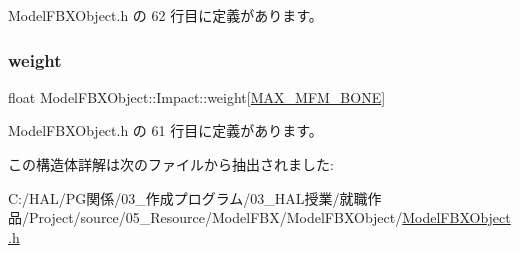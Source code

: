  Model\+F\+B\+X\+Object.\+h の 62 行目に定義があります。

\mbox{\label{struct_model_f_b_x_object_1_1_impact_a863397edc05dc95c5a39e77947f2453a}} 
\subsubsection{\texorpdfstring{weight}{weight}}
{\footnotesize\ttfamily float Model\+F\+B\+X\+Object\+::\+Impact\+::weight\mbox{[}\mbox{\hyperlink{_model_f_b_x_object_8h_a73b1fbbe9f60c4c5bfbc131d9672213a}{M\+A\+X\+\_\+\+M\+F\+M\+\_\+\+B\+O\+NE}}\mbox{]}}



 Model\+F\+B\+X\+Object.\+h の 61 行目に定義があります。



この構造体詳解は次のファイルから抽出されました\+:\begin{DoxyCompactItemize}
\item 
C\+:/\+H\+A\+L/\+P\+G関係/03\+\_\+作成プログラム/03\+\_\+\+H\+A\+L授業/就職作品/\+Project/source/05\+\_\+\+Resource/\+Model\+F\+B\+X/\+Model\+F\+B\+X\+Object/\mbox{\hyperlink{_model_f_b_x_object_8h}{Model\+F\+B\+X\+Object.\+h}}\end{DoxyCompactItemize}
